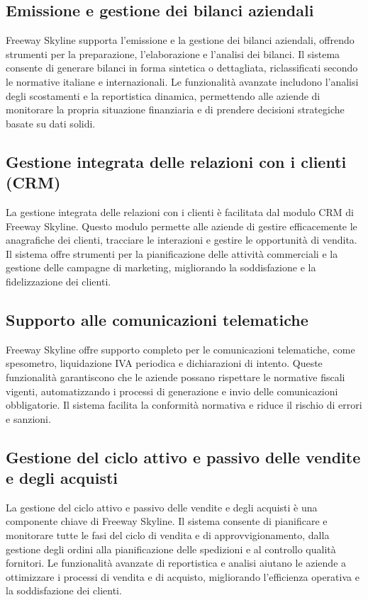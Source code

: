 \documentclass{article}
\begin{document}
\subsection{Emissione e gestione dei bilanci aziendali}

Freeway Skyline supporta l'emissione e la gestione dei bilanci aziendali, offrendo strumenti per la preparazione, l'elaborazione e l'analisi dei bilanci. Il sistema consente di generare bilanci in forma sintetica o dettagliata, riclassificati secondo le normative italiane e internazionali. Le funzionalità avanzate includono l'analisi degli scostamenti e la reportistica dinamica, permettendo alle aziende di monitorare la propria situazione finanziaria e di prendere decisioni strategiche basate su dati solidi.

\subsection{Gestione integrata delle relazioni con i clienti (CRM)}

La gestione integrata delle relazioni con i clienti è facilitata dal modulo CRM di Freeway Skyline. Questo modulo permette alle aziende di gestire efficacemente le anagrafiche dei clienti, tracciare le interazioni e gestire le opportunità di vendita. Il sistema offre strumenti per la pianificazione delle attività commerciali e la gestione delle campagne di marketing, migliorando la soddisfazione e la fidelizzazione dei clienti.

\subsection{Supporto alle comunicazioni telematiche}

Freeway Skyline offre supporto completo per le comunicazioni telematiche, come spesometro, liquidazione IVA periodica e dichiarazioni di intento. Queste funzionalità garantiscono che le aziende possano rispettare le normative fiscali vigenti, automatizzando i processi di generazione e invio delle comunicazioni obbligatorie. Il sistema facilita la conformità normativa e riduce il rischio di errori e sanzioni.

\subsection{Gestione del ciclo attivo e passivo delle vendite e degli acquisti}

La gestione del ciclo attivo e passivo delle vendite e degli acquisti è una componente chiave di Freeway Skyline. Il sistema consente di pianificare e monitorare tutte le fasi del ciclo di vendita e di approvvigionamento, dalla gestione degli ordini alla pianificazione delle spedizioni e al controllo qualità fornitori. Le funzionalità avanzate di reportistica e analisi aiutano le aziende a ottimizzare i processi di vendita e di acquisto, migliorando l'efficienza operativa e la soddisfazione dei clienti.
\end{document}
